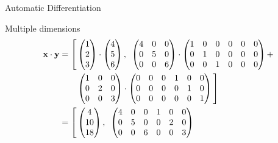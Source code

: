 \begin{frame}{Automatic Differentiation}
    \begin{block}{Multiple dimensions}
        \begin{align*}
            \textbf{x}\cdot\textbf{y} &= \Vast[\adpair{\begin{pmatrix}
            1\\2\\3
            \end{pmatrix}
            \cdot
            \begin{pmatrix}
            4\\5\\6
            \end{pmatrix}
            }{
            \begin{pmatrix}
            4&0&0\\
            0&5&0\\
            0&0&6\end{pmatrix}
            \cdot
            \begin{pmatrix}
            1&0&0&0&0&0\\
            0&1&0&0&0&0\\
            0&0&1&0&0&0
            \end{pmatrix}
            +\\
            &\hspace{2em}\begin{pmatrix}
            1&0&0\\
            0&2&0\\
            0&0&3
            \end{pmatrix}
            \cdot
            \begin{pmatrix}
            0&0&0&1&0&0\\
            0&0&0&0&1&0\\
            0&0&0&0&0&1
            \end{pmatrix}}\Vast]
            \\
            &= \Vast[\adpair{
            \begin{pmatrix}
            4\\10\\18
            \end{pmatrix}
            }{
            \begin{pmatrix}
            4&0&0&1&0&0\\
            0&5&0&0&2&0\\
            0&0&6&0&0&3
            \end{pmatrix}
}
\end{align*}
\end{block}
\end{frame}
